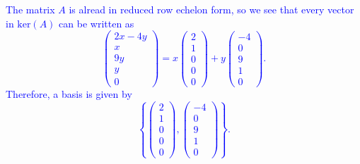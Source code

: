 \documentclass[a4paper,11pt]{article}
\newcommand{\blue}[1]{\textcolor{blue}{#1}}
\begin{document}
\begin{enumerate}[(a)]
  \blue{The matrix $A$ is alread in reduced row echelon form, so we see that
    every vector in $\text{ker}(A)$ can be written as
    \[
      \left(
        \begin{array}{c}
          2x-4y \\ x \\ 9y \\ y \\ 0
        \end{array}
      \right)
      =x
      \left(
        \begin{array}{r}
          2 \\ 1 \\ 0 \\ 0 \\ 0
        \end{array}
      \right)
      +y
      \left(
        \begin{array}{r}
          -4 \\ 0 \\ 9 \\ 1 \\ 0
        \end{array}
      \right).
    \]
    Therefore, a basis is given by
    \[
      \left\{
        \left(
          \begin{array}{r}
            2 \\ 1 \\ 0 \\ 0 \\ 0
          \end{array}
        \right),
        \left(
          \begin{array}{r}
            -4 \\ 0 \\ 9 \\ 1 \\ 0
          \end{array}
        \right)
      \right\}.
    \] \\}
\end{enumerate}
\end{document}

